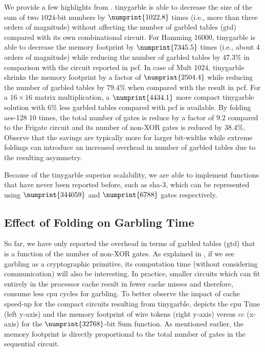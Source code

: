 We provide a few highlights from .
\gls{tinygarble} is able to decrease the size of the sum of two $1024$-bit numbers by $\numprint{1022.8}$ times (i.e., more than three orders of magnitude) without affecting the number of garbled tables (\acrshort{gtd}) compared with its own combinational circuit.
For Hamming 16000, \gls{tinygarble} is able to decrease the memory footprint by $\numprint{7345.5}$ times (i.e., about 4 orders of magnitude) while reducing the number of garbled tables by $47.3\%$ in comparison with the circuit reported in \gls{pcf}.
In case of Mult 1024, \gls{tinygarble} shrinks the memory footprint by a factor of $\numprint{2504.4}$ while reducing the number of garbled tables by $79.4\%$ when compared with the result in \gls{pcf}.
For a $16\times 16$ matrix multiplication, a $\numprint{4434.1}$ more compact \gls{tinygarble} solution with $6\%$ less garbled tables compared with \gls{pcf} is available.
By folding \acrshort{aes}-128 10 times, the total number of gates is reduce by a factor of $9.2$ compared to the Frigate circuit and its number of non-XOR gates is reduced by $38.4\%$.
Observe that the savings are typically more for larger bit-widths while extreme foldings can introduce an increased overhead in number of garbled tables due to the resulting asymmetry.

Because of the \gls{tinygarble} superior scalability, we are able to implement functions that have never been reported before, such as \acrshort{sha}-3, which can be represented using $\numprint{344059}$ and $\numprint{6788}$ gates respectively.

\subsection{Effect of Folding on Garbling Time} \label{ssec:eval-tinygarble-timing}
So far, we have only reported the overhead in terms of garbled tables (\acrshort{gtd}) that is a function of the number of non-XOR gates.
As explained in \cite{bellare2013efficient}, if we see garbling as a cryptographic primitive, its computation time (without considering communication) will also be interesting.
In practice, smaller circuits which can fit entirely in the processor cache result in fewer cache misses and therefore, consume less \acrshort{cpu} cycles for garbling.
To better observe the impact of cache speed-up for the compact circuits resulting from \gls{tinygarble},  depicts the \acrshort{cpu} Time (left y-axis) and the memory footprint of wire tokens (right y-axis) versus $cc$ (x-axis) for the $\numprint{32768}$-bit Sum function.
As mentioned earlier, the memory footprint is directly proportional to the total number of gates in the sequential circuit.

